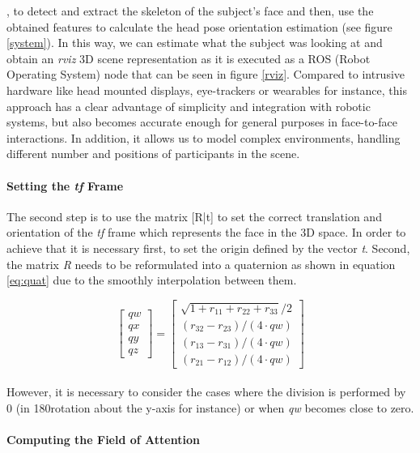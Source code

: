 \documentclass{sig-alternate}
\begin{document}
, to detect and extract the skeleton
of the subject's face and then, use the obtained features to calculate the
head pose orientation estimation (see figure \ref{system}). In this way, we can
estimate what the subject was looking at and obtain an \textit{rviz} 3D scene
representation as it is executed as a ROS (Robot Operating System) node that can
be seen in figure \ref{rviz}. Compared to intrusive hardware like head mounted
displays, eye-trackers or wearables for instance, this approach has a clear
advantage of simplicity and integration with robotic systems, but also becomes
accurate enough for general purposes in face-to-face interactions. In addition,
it allows us to model complex environments, handling different number and
positions of participants in the scene.

\paragraph{Setting the \textit{tf} Frame}
The second step is to use the matrix [R|t] to set the correct translation and
orientation of the \textit{tf} frame which represents the face in the 3D space.
In order to achieve that it is necessary first, to set the origin defined by the
vector \textit{t}. Second, the matrix \textit{R} needs to be reformulated into a
quaternion as shown in equation \ref{eq:quat} due to the smoothly interpolation
between them.

\begin{equation}
\begin{bmatrix}
qw \\
qx \\
qy \\
qz
\end{bmatrix}
=
\begin{bmatrix}
\sqrt{1 + r_{11} + r_{22} + r_{33}} /2 \\
(r_{32} - r_{23})/( 4 \cdot qw) \\
(r_{13} - r_{31})/( 4 \cdot qw) \\
(r_{21} - r_{12})/( 4 \cdot qw)
\end{bmatrix}
\label{eq:quat}
\end{equation}
\\
However, it is necessary to consider the cases where the division is performed
by 0 (in 180\degree rotation about the y-axis for instance) or when \textit{qw}
becomes close to zero.

\paragraph{Computing the Field of Attention}
\end{document}
